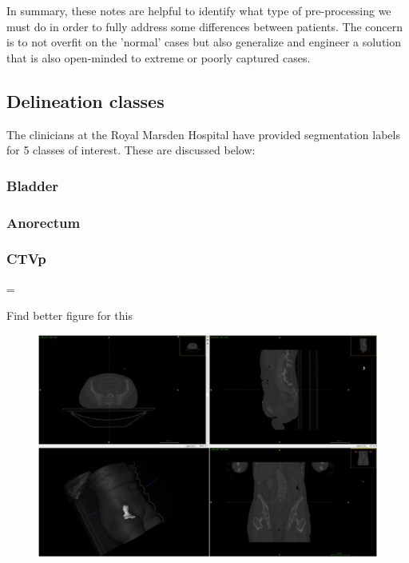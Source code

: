 \documentclass[11pt,twoside]{report}
\newenvironment{warning}
  {\par\begin{mdframed}[linewidth=1pt,linecolor=black]%
    \begin{list}{}{\leftmargin=1cm
                   \labelwidth=\leftmargin}\item[\Large\ding{43}]}
  {\end{list}\end{mdframed}\par}
\begin{document}
In summary, these notes are helpful to identify what type of pre-processing we must do in order to fully address some differences between patients. The concern is to not overfit on the 'normal' cases but also generalize and engineer a solution that is also open-minded to extreme or poorly captured cases.

\subsection{Delineation classes}\label{sec:data-delineation-classes}

The clinicians at the Royal Marsden Hospital have provided segmentation labels for 5 classes of interest. These are discussed below:

\subsubsection{Bladder}\label{sec:data-Bladder}

\subsubsection{Anorectum}\label{sec:data-Anorectum}

\subsubsection{CTVp}\label{sec:data-CTVp}

\begin{warning}
  Find better figure for this
\end{warning}

\begin{figure}[H]
  \centering
  \includegraphics[width=0.7\linewidth]{../figures/CTVp.png}
  \label{fig:example-CTVp}
\end{figure}
\end{document}
